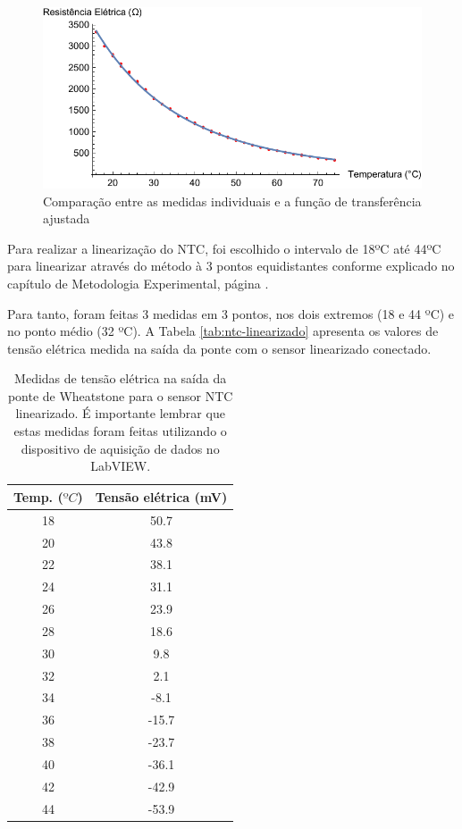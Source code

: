 \documentclass[a4paper]{instrumentacao}
\begin{document}
\begin{figure}[H]
\center
\includegraphics[width=\textwidth]{NTC-FitPlot.pdf}
\caption{Comparação entre as medidas individuais e a função de transferência ajustada}
\label{ntc-experimental-comparacao}
\end{figure}

Para realizar a linearização do NTC, foi escolhido o intervalo de 18ºC até 44ºC para linearizar através do método à 3 pontos equidistantes conforme explicado no capítulo de Metodologia Experimental, página \pageref{sec:ntc-linearizacao}.

Para tanto, foram feitas 3 medidas em 3 pontos, nos dois extremos (18 e 44 ºC) e no ponto médio (32 ºC). A Tabela \ref{tab:ntc-linearizado} apresenta os valores de tensão elétrica medida na saída da ponte com o sensor linearizado conectado.

\begin{table}[H]
\centering
\caption{Medidas de tensão elétrica na saída da ponte de Wheatstone para o sensor NTC linearizado. É importante lembrar que estas medidas foram feitas utilizando o dispositivo de aquisição de dados no LabVIEW.}
\label{tab:amostras-linearizado}
\begin{tabular}{|c|c|}
\hline
\textbf{Temp. ($ºC$)} & \textbf{Tensão elétrica (mV)} \\ \hline
 18 & 50.7  \\ \hline
 20 & 43.8  \\ \hline
 22 & 38.1  \\ \hline
 24 & 31.1  \\ \hline
 26 & 23.9  \\ \hline
 28 & 18.6  \\ \hline
 30 & 9.8   \\ \hline
 32 & 2.1   \\ \hline
 34 & -8.1  \\ \hline
 36 & -15.7 \\ \hline
 38 & -23.7 \\ \hline
 40 & -36.1 \\ \hline
 42 & -42.9 \\ \hline
 44 & -53.9 \\ \hline
\end{tabular}
\end{table}
\end{document}
